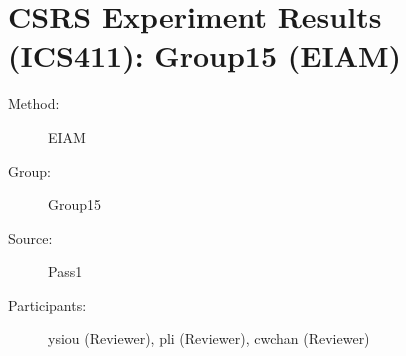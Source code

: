 \chapter {CSRS Experiment Results (ICS411): Group15 (EIAM)}
\small
	  

\begin{description}
\item [Method:] EIAM
\item [Group:] Group15
\item [Source:] Pass1
\item [Participants:] ysiou (Reviewer), pli (Reviewer), cwchan (Reviewer)
\end{description}
